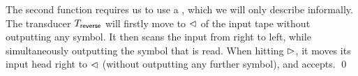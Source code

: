 \begin{example}
%
%
The second function requires us to use a \FFT{}, which we will only describe
informally. The transducer $T_{\sf reverse}$ will firstly move to $\vartriangleleft$ of the input tape
    without outputting any symbol. It then scans the input from
    right to left, while simultaneously outputting the symbol that is read.
    When hitting $\vartriangleright$, it moves its input head right to $\vartriangleleft$ (without outputting any further symbol), and accepts.     \qed
\end{example}



